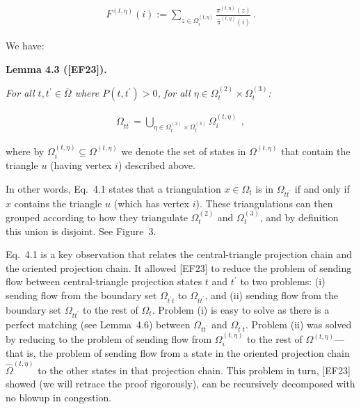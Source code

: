 \documentclass[10pt,a4paper]{article}
\begin{document}
\[\begin{gathered}
F^{(t,\eta)}(i):=\sum_{z\in\Omega_{i}^{(t,\eta)}}\frac{\pi^{(t,\eta)}(z)}{\hat{\pi}^{(t,\eta)}(i)}\,.
\end{gathered}\]




We have:\par





\par\medskip\noindent\textbf{\textbf{Lemma 4.3}\textbf{ }([EF23])\textbf{.}}\par



\emph{For all $t,t^{\prime}\in\overline{\Omega}$ where $P(t,t^{\prime})>0$, for all $\eta\in\Omega_{t}^{(2)}\times\Omega_{t}^{(3)}$:}\par


\[\begin{gathered}
\Omega_{tt^{\prime}}=\bigcup_{\eta\in\Omega_{t}^{(2)}\times\Omega_{t}^{(3)}}\Omega_{i}^{(t,\eta)}\ \,,
\end{gathered}\]






where by $\Omega_{i}^{(t,\eta)}\subseteq\Omega^{(t,\eta)}$ we denote the set of states in $\Omega^{(t,\eta)}$ that contain the triangle $u$ (having vertex $i$) described above.\par




In other words, Eq. 4.1 states that a triangulation $x\in\Omega_{t}$ is in $\Omega_{tt^{\prime}}$ if and only if $x$ contains the triangle $u$ (which has vertex $i$). These triangulations can then grouped according to how they triangulate $\Omega_{t}^{(2)}$ and $\Omega_{t}^{(3)}$, and by definition this union is disjoint. See Figure 3.\par




Eq. 4.1 is a key observation that relates the central-triangle projection chain and the oriented projection chain. It allowed [EF23] to reduce the problem of sending flow between central-triangle projection states $t$ and $t^{\prime}$ to two problems: (i) sending flow from the boundary set $\Omega_{t^{\prime}t}$ to $\Omega_{tt^{\prime}}$, and (ii) sending flow from the boundary set $\Omega_{tt^{\prime}}$ to the rest of $\Omega_{t}$. Problem (i) is easy to solve as there is a perfect matching (see Lemma 4.6) between $\Omega_{tt^{\prime}}$ and $\Omega_{t^{\prime}t}$. Problem (ii) was solved by reducing to the problem of sending flow from $\Omega_{i}^{(t,\eta)}$ to the rest of $\Omega^{(t,\eta)}$—that is, the problem of sending flow from a state in the oriented projection chain $\hat{\Omega}^{(t,\eta)}$ to the other states in that projection chain. This problem in turn, [EF23] showed (we will retrace the proof rigorously), can be recursively decomposed with no blowup in congestion.\par
\end{document}
